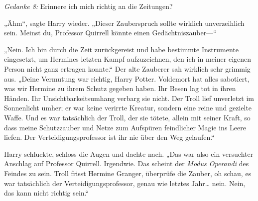 \emph{Gedanke 8:} Erinnere ich mich richtig an die Zeitungen?

„Ähm“, sagte Harry wieder. „Dieser Zauberspruch sollte wirklich unverzeihlich sein. Meinst du, Professor Quirrell könnte einen Gedächtniszauber—“

„Nein. Ich bin durch die Zeit zurückgereist und habe bestimmte Instrumente eingesetzt, um Hermines letzten Kampf aufzuzeichnen, den ich in meiner eigenen Person nicht ganz ertragen konnte.“
Der alte Zauberer sah wirklich sehr grimmig aus.
„Deine Vermutung war richtig, Harry Potter. Voldemort hat alles sabotiert, was wir Hermine zu ihrem Schutz gegeben haben. Ihr Besen lag tot in ihren Händen. Ihr Unsichtbarkeitsumhang verbarg sie nicht. Der Troll lief unverletzt im Sonnenlicht umher; er war keine verirrte Kreatur, sondern eine reine und gezielte Waffe. Und es war tatsächlich der Troll, der sie tötete, allein mit seiner Kraft, so dass meine Schutzzauber und Netze zum Aufspüren feindlicher Magie ins Leere liefen. Der Verteidigungsprofessor ist ihr nie über den Weg gelaufen.“

Harry schluckte, schloss die Augen und dachte nach.
„Das war also ein versuchter Anschlag auf Professor Quirrell. Irgendwie. Das scheint der \emph{Modus Operandi} des Feindes zu sein. Troll frisst Hermine Granger, überprüfe die Zauber, oh schau, es war tatsächlich der Verteidigungsprofessor, genau wie letztes Jahr… nein. Nein, das kann nicht richtig sein.“

